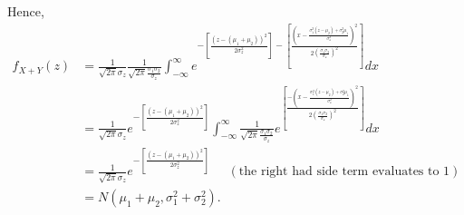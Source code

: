 \documentclass{article}
\begin{document}
Hence,
\begin{align}
    f_{X+Y}(z) & = \frac{1}{\sqrt{2\pi}\sigma_z}\frac{1}{\sqrt{2\pi}\frac{\sigma_1\sigma_2}{\sigma_z}}\int_{-\infty}^{\infty}e^{-\left[\frac{(z-(\mu_1+\mu_2))^2}{2\sigma_z^2}\right]-\left[\frac{\left(x-\frac{\sigma_1^2(z-\mu_2)+\sigma_2^2\mu_1}{\sigma_z^2}\right)^2}{2\left(\frac{\sigma_1\sigma_2}{\sigma_z}\right)^2}\right]}dx \\
    & = \frac{1}{\sqrt{2\pi}\sigma_z}e^{-\left[\frac{(z-(\mu_1+\mu_2))^2}{2\sigma_z^2}\right]}\int_{-\infty}^{\infty}\frac{1}{\sqrt{2\pi}\frac{\sigma_1\sigma_2}{\sigma_z}}e^{\left[\frac{-\left(x-\frac{\sigma_1^2(z-\mu_2)+\sigma_2^2\mu_1}{\sigma_z^2}\right)^2}{2\left(\frac{\sigma_1\sigma_2}{\sigma_z}\right)^2}\right]}dx \\
    & = \frac{1}{\sqrt{2\pi}\sigma_z}e^{-\left[\frac{(z-(\mu_1+\mu_2))^2}{2\sigma_z^2}\right]} \;\;\;\;\; (\text{the right had side term evaluates to 1}) \\
    & = N(\mu_1+\mu_2,\sigma_1^2+\sigma_2^2).
\end{align}
\end{document}

